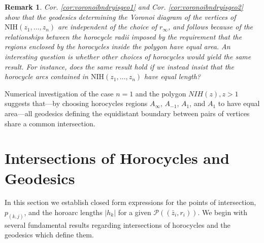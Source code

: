 \documentclass[10pt,a4paper]{article}
\newtheorem*{remark}{Remark}
\newcommand{\p}[2]{p_{(#1,#2)}}
\newcommand{\z}[1]{\bar{z}_{#1}}
\newcommand{\len}[1]{\left\lvert #1 \right\rvert}
\begin{document}
 \begin{remark}
   Cor. \ref{cor:voronoibndryisgeo1} and Cor. \ref{cor:voronoibndryisgeo2} show that the geodesics determining the Voronoi diagram of the vertices of $\text{NIH}(z_1, \ldots, z_n)$ are independent of the choice of $r_{\infty}$, and follows because of the relationships between the horocycle radii imposed by the requirement that the regions enclosed by the horocycles inside the polygon have equal area. An interesting question is whether other choices of horocycles would yield the same result.  For instance, does the same result hold if we instead insist that the horocycle arcs contained in $\text{NIH}(z_1, \ldots, z_n)$ have equal length? 
 \end{remark}

 Numerical investigation of the case $n=1$ and the polygon $NIH(z), z > 1$ suggests that---by choosing horocycles regions $A_{\infty}$, $A_{-1}$, $A_{1}$, and $A_1$ to have equal area---all geodesics defining the equidistant boundary between pairs of vertices share a common intersection.


























\section{Intersections of Horocycles and Geodesics}
\label{sec:intershorosgeos}
In this section we establish closed form expressions for the points of intersection, $\p{k}{j}$, and the horoarc lengths $\len{h_k}$ for a given $\mathcal{P}((\z{i},r_i))$. We begin with several fundamental results regarding intersections of horocycles and the geodesics which define them.
\end{document}

